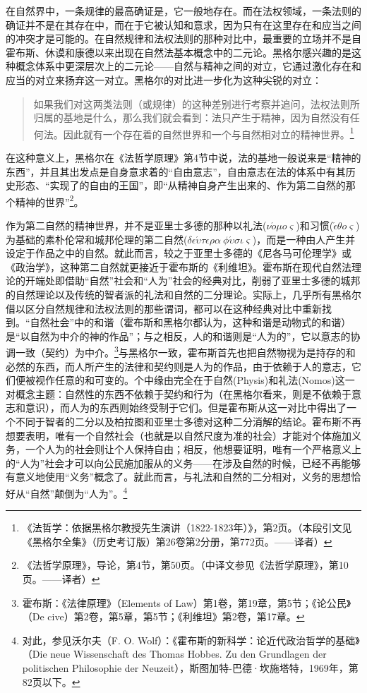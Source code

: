 在自然界中，一条规律的最高确证是，它一般地存在。而在法权领域，一条法则的确证并不是在其存在中，而在于它被认知和意求，因为只有在这里存在和应当之间的冲突才是可能的。在自然规律和法权法则的那种对比中，最重要的立场并不是自霍布斯、休谟和康德以来出现在自然法基本概念中的二元论。黑格尔感兴趣的是这种概念体系中更深层次上的二元论——自然与精神之间的对立，它通过激化存在和应当的对立来扬弃这一对立。黑格尔的对比进一步化为这种尖锐的对立：

\begin{quote}
如果我们对这两类法则（或规律）的这种差别进行考察并追问，法权法则所归属的基地是什么，那么我们就会看到：法只产生于精神，因为自然没有任何法。因此就有一个存在着的自然世界和一个与自然相对立的精神世界。\footnote{《法哲学：依据黑格尔教授先生演讲（1822-1823年）》，第2页。（本段引文见《黑格尔全集》（历史考订版）第26卷第2分册，第772页。——译者）}
\end{quote}

在这种意义上，黑格尔在《法哲学原理》第4节中说，法的基地一般说来是“精神的东西”，并且其出发点是自身意求着的“自由意志”，自由意志在法的体系中有其历史形态、“实现了的自由的王国”，即“从精神自身产生出来的、作为第二自然的那个精神的世界”\footnote{《法哲学原理》，导论，第4节，第50页。（中译文参见《法哲学原理》，第10页。——译者）}。

作为第二自然的精神世界，并不是亚里士多德的那种以礼法($\nu\acute{o}\mu o\varsigma$)和习惯($\check{\epsilon}\theta o\varsigma$)为基础的素朴伦常和城邦伦理的第二自然($\delta\epsilon\acute{\upsilon}\tau\epsilon\rho\alpha\ \phi\acute{\upsilon}\sigma\iota\varsigma$)，而是一种由人产生并设定于作品之中的自然。就此而言，较之于亚里士多德的《尼各马可伦理学》或《政治学》，这种第二自然就更接近于霍布斯的《利维坦》。霍布斯在现代自然法理论的开端处即借助“自然”社会和“人为”社会的经典对比，削弱了亚里士多德的城邦的自然理论以及传统的智者派的礼法和自然的二分理论。实际上，几乎所有黑格尔借以区分自然规律和法权法则的那些谓词，都可以在这种经典对比中重新找到。“自然社会”中的和谐（霍布斯和黑格尔都认为，这种和谐是动物式的和谐）是“以自然为中介的神的作品”；与之相反，人的和谐则是“人为的”，它以意志的协调一致（契约）为中介。\footnote{霍布斯：《法律原理》（Elements of Law）第1卷，第19章，第5节；《论公民》（De cive）第2卷，第5章，第5节；《利维坦》第2卷，第17章。}与黑格尔一致，霍布斯首先也把自然物视为是持存的和必然的东西，而人所产生的法律和契约则是人为的作品，由于依赖于人的意志，它们便被视作任意的和可变的。个中缘由完全在于自然(Physis)和礼法(Nomos)这一对概念主题：自然性的东西不依赖于契约和行为（在黑格尔看来，则是不依赖于意志和意识），而人为的东西则始终受制于它们。但是霍布斯从这一对比中得出了一个不同于智者的二分以及柏拉图和亚里士多德对这种二分消解的结论。霍布斯不再想要表明，唯有一个自然社会（也就是以自然尺度为准的社会）才能对个体施加义务，一个人为的社会则让个人保持自由；相反，他想要证明，唯有一个严格意义上的“人为”社会才可以向公民施加服从的义务——在涉及自然的时候，已经不再能够有意义地使用“义务”概念了。就此而言，与礼法和自然的二分相对，义务的思想恰好从“自然”颠倒为“人为”。\footnote{对此，参见沃尔夫（F. O. Wolf）：《霍布斯的新科学：论近代政治哲学的基础》（Die neue Wissenschaft des Thomas Hobbes. Zu den Grundlagen der politischen Philosophie der Neuzeit），斯图加特-巴德·坎施塔特，1969年，第82页以下。}

